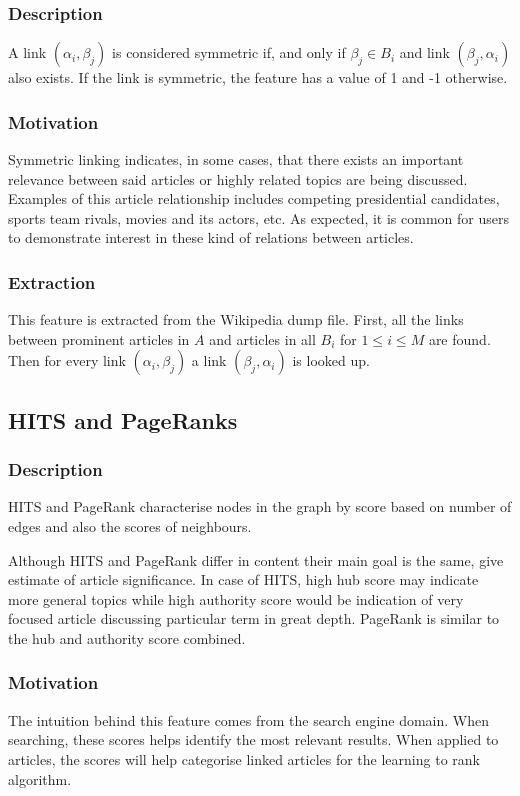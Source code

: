 \subsubsection{Description}
A link $(\alpha_i, \beta_j)$ is considered symmetric if, and only if $\beta_j \in B_i$ and link $(\beta_j, \alpha_i)$ also exists. If the link is symmetric, the feature has a value of 1 and -1 otherwise.

\subsubsection{Motivation}
Symmetric linking indicates, in some cases, that there exists an important relevance between said articles or highly related topics are being discussed. Examples of this article relationship includes competing presidential candidates, sports team rivals, movies and its actors, etc. As expected, it is common for users to demonstrate interest in these kind of relations between articles.

\subsubsection{Extraction}
This feature is extracted from the Wikipedia dump file. First, all the links between prominent articles in $A$ and articles in all $B_i$ for $1 \le i \le M$ are found. Then for every link $(\alpha_i, \beta_j)$ a link $(\beta_j, \alpha_i)$ is looked up.

\subsection{HITS and PageRanks}
\subsubsection{Description}
HITS and PageRank characterise nodes in the graph by score based on number of edges and also the scores of neighbours.

Although HITS and PageRank differ in content their main goal is the same, give estimate of article significance. In case of HITS, high hub score may indicate more general topics while high authority score would be indication of very focused article discussing particular term in great depth. PageRank is similar to the hub and authority score combined.

\subsubsection{Motivation}
The intuition behind this feature comes from the search engine domain. When searching, these scores helps identify the most relevant results. When applied to articles, the scores will help categorise linked articles for the learning to rank algorithm.

